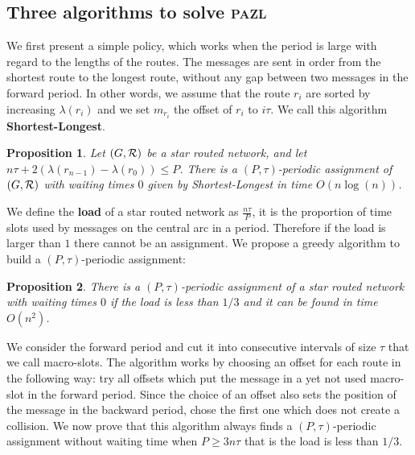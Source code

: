 \documentclass[10pt, conference, letterpaper]{IEEEtran}
\newtheorem{proposition}{Proposition}
\newcommand\pazl{\textsc{pazl}\xspace}
\begin{document}
    \subsection{Three algorithms to solve \pazl}

    We first present a simple policy, which works when the period is large with regard to the lengths of the routes.
    The messages are sent in order from the shortest route to the longest route, without any gap between two messages in the forward period.
    In other words, we assume that the route $r_i$ are sorted by increasing $\lambda(r_i)$ and we set $m_{r_i}$ the offset of $r_i$ to $i\tau$. We call this algorithm {\bf Shortest-Longest}.
      \begin{proposition} Let $(G, {\cal R})$ be a star routed network, and let $n\tau + 2(\lambda(r_{n-1}) - \lambda(r_{0})) \leq P$. There is a $(P,\tau)$-periodic assignment of $(G, {\cal R})$ with waiting times $0$ given by Shortest-Longest in time $O(n\log(n))$\cite{versionlongue}.\label{prop:SL}
      \end{proposition}

      

      We define the \textbf{load} of a star routed network as $\frac{n\tau}{P}$, it is the proportion of time slots used by messages on the central arc in a period. Therefore if the load is larger than $1$ there cannot be an assignment. We propose a greedy algorithm to build a $(P,\tau)$-periodic assignment:
	 \begin{proposition}
    There is a $(P,\tau)$-periodic assignment of a star routed network with waiting times $0$ if the load is less than $1/3$ and it can be found in time $O(n^2)$.
    \end{proposition}
     We consider the forward period and cut it into consecutive intervals of size $\tau$ that we call macro-slots. The algorithm works by choosing an offset for each route in the following way: try all offsets which put the message in a yet not used macro-slot in the forward
     period. Since the choice of an offset also sets the position of the message in the backward period, chose the first one which does not create a collision. We now prove that this algorithm always finds a $(P,\tau)$-periodic assignment without waiting time when $P \geq 3n\tau$ that is the load is less than $1/3$.
	
\end{document}
